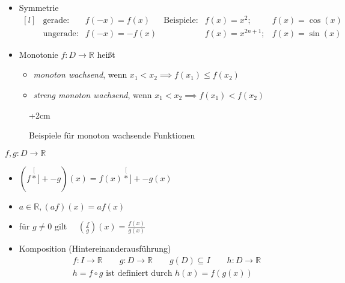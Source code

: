 \begin{definition}
\begin{itemize}
	
	\item Symmetrie
	\[
	\begin{matrix}[l]
		&\text{gerade:}		&f(-x) = f(x)	&\text{Beispiele:}	&f(x) = x^2; 	&f(x) = \cos(x) \\
		&\text{ungerade:}	&f(-x) = -f(x) &             &f(x) = x^{2n+1};	&f(x) = \sin(x)
	\end{matrix}
	\]
	
	\item Monotonie \newline \(f:D\rightarrow \mathbb{R}\) heißt
	\begin{itemize}
		\item \emph{monoton wachsend}, wenn \(x_1<x_2 \implies f(x_1) \leq f(x_2)\)
		\item \emph{streng monoton wachsend}, 
			  wenn \(x_1<x_2 \implies f(x_1) < f(x_2)\)
	\end{itemize}		
\end{itemize}

\begin{figure}[h]
	\advance\leftskip+2cm
\caption{Beispiele für monoton wachsende Funktionen}
\end{figure}

\end{definition}

\begin{definition}[Operationen]
\( f,g: D \rightarrow \mathbb{R} \)
\begin{itemize}
	\item \((f \stackrel[\ast]{+}{-} g)(x) = f(x)  \stackrel[\ast]{+}{-} g(x) \)
	\item \(a \in \mathbb{R}, (af)(x)=af(x)\)
	\item für \(\displaystyle g \neq 0 \text{ gilt }\quad \left(\frac{f}{g}\right)(x)=\frac{f(x)}{g(x)}\)
	\item 	Komposition (Hintereinanderausführung)
	\begin{align*} &f:I\rightarrow\mathbb{R}\qquad  g:D\rightarrow\mathbb{R}\qquad g(D) \subseteq I\qquad h:D\rightarrow\mathbb{R} \\ &h = f \circ g  \text{ ist definiert durch } h(x) = f( g(x) )
	\end{align*}
\end{itemize}

\end{definition}

